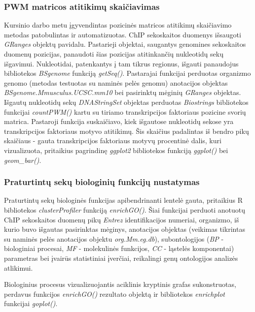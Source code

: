 \documentclass[12pt]{article}
\begin{document}
\subsubsection*{PWM matricos atitikimų skaičiavimas}
Kursinio darbo metu įgyvendintas pozicinės matricos atitikimų skaičiavimo
metodas patobulintas ir automatizuotas. ChIP sekoskaitos duomenys išsaugoti
\emph{GRanges} objektų pavidalu. Pastarieji objektai, saugantys genomines
sekoskaitos duomenų pozicijas, panaudoti šias pozicijas atitinkančių nukleotidų
sekų išgavimui. Nukleotidai, patenkantys į tam tikrus regionus, išgauti
panaudojus bibliotekos \emph{BSgenome}\cite{BSGENOME} funkciją \emph{getSeq()}.
Pastarajai funkcijai perduotas organizmo genomo (metodas testuotas su naminės
pelės genomu) anotacijos objektas
\emph{BSgenome.Mmusculus.UCSC.mm10}\cite{BSMUSMUSCULUS} bei pasirinktų mėginių
\emph{GRanges} objektas. Išgautų nukleotidų sekų \emph{DNAStringSet} objektas
perduotas \emph{Biostrings}\cite{BIOSTRINGS} bibliotekos funkcijai
\emph{countPWM()} kartu su tiriamo transkripcijos faktoriaus pozicine svorių
matrica. Pastaroji funkcija suskaičiavo, kiek išgautose nukleotidų sekose yra
transkripcijos faktoriaus motyvo atitikimų. Šis skaičius padalintas iš bendro
pikų skaičiaus - gauta transkripcijos faktoriaus motyvų procentinė dalis,
kuri vizualizuota, pritaikius pagrindinę \emph{ggplot2} bibliotekos funkciją
\emph{ggplot()} bei \emph{geom\_bar()}.

\subsubsection*{Praturtintų sekų biologinių funkcijų nustatymas}
Praturtintų sekų biologinės funkcijas apibendrinanti lentelė gauta, pritaikius R
bibliotekos \emph{clusterProfiler}\cite{CLUSTERPROFILER} funkciją
\emph{enrichGO()}. Šiai funkcijai perduoti anotuotų ChIP sekoskaitos duomenų
pikų \emph{Entrez} identifikacijos numeriai, organizmo, iš kurio buvo išgautas
pasirinktas mėginys, anotacijos objektas (veikimas tikrintas su naminės pelės
anotacijos objektu \emph{org.Mm.eg.db}), subontologijos (\emph{BP} -
biologiniai procesai, \emph{MF} - molekulinės funkcijos, \emph{CC} - ląstelės
komponentai) parametras bei įvairūs statistiniai įverčiai, reikalingi genų
ontologijos analizės atlikimui.

Biologinius procesus vizualizuojantis aciklinis kryptinis grafas sukonstruotas,
perdavus funkcijos \emph{enrichGO()} rezultato objektą ir bibliotekos
\emph{enrichplot}\cite{ENRICHPLOT} funkcijai \emph{goplot()}.
\end{document}
